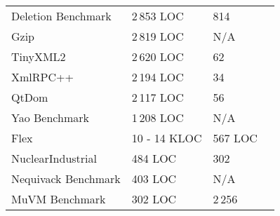 \begin{table}[h]
\begin{tabular}{p{2cm}p{2cm}p{1cm}p{3cm}}
Deletion Benchmark & 2\,853 LOC & 814 & \cite{delamaro2014designing,delamaro2014experimental}\\
Gzip & 2\,819 LOC & N/A & \cite{kintis2017detecting,papadakis2015trivial}\\
TinyXML2 & 2\,620 LOC & 62 & \cite{delgado2017assessment,delgado2015class}\\
XmlRPC++ & 2\,194 LOC & 34 & \cite{delgado2017assessment,delgado2015class}\\
QtDom & 2\,117 LOC & 56 & \cite{delgado2017assessment}\\
Yao Benchmark & 1\,208 LOC& N/A & \cite{yao2014study}\\
Flex & 10 - 14 KLOC & 567 LOC& \cite{papadakis2014mitigating,yao2014study}\\
NuclearIndustrial & 484 LOC & 302 & \cite{delgado2018evaluation}\\
Nequivack Benchmark & 403 LOC & N/A & \cite{holling2016nequivack}\\
MuVM Benchmark & 302 LOC & 2\,256 & \cite{tokumoto2016muvm}\\
\hline                                                         
\end{tabular}
\end{table}

